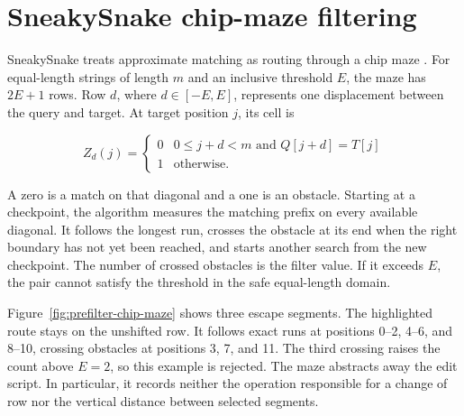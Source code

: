 \section{SneakySnake chip-maze filtering}
\label{sec:prefilter-sneakysnake}

SneakySnake treats approximate matching as routing through a chip maze
\cite{sneakysnake_paper}. For equal-length strings of length \(m\) and an
inclusive threshold \(E\), the maze has \(2E+1\) rows. Row \(d\), where
\(d\in[-E,E]\), represents one displacement between the query and target. At
target position \(j\), its cell is

\[
 Z_d(j)=
 \begin{cases}
 0 & 0\leq j+d<m \text{ and } Q[j+d]=T[j]\\
 1 & \text{otherwise.}
 \end{cases}
\]

A zero is a match on that diagonal and a one is an obstacle. Starting at a
checkpoint, the algorithm measures the matching prefix on every available
diagonal. It follows the longest run, crosses the obstacle at its end when the
right boundary has not yet been reached, and starts another search from the
new checkpoint. The number of crossed obstacles is the filter value. If it
exceeds \(E\), the pair cannot satisfy the threshold in the safe equal-length
domain.

Figure~\ref{fig:prefilter-chip-maze} shows three escape segments. The
highlighted route stays on the unshifted row. It follows exact runs at
positions 0--2, 4--6, and 8--10, crossing obstacles at positions 3, 7, and 11.
The third crossing raises the count above \(E=2\), so this example is rejected.
The maze abstracts away the edit script. In particular, it records neither the
operation responsible for a change of row nor the vertical distance between
selected segments.


